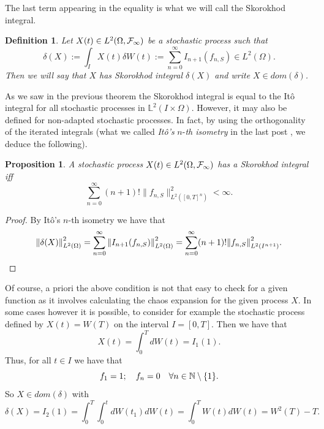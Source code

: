 \documentclass[12pt]{article}
\newtheorem{proposition}{Proposition}
\newtheorem{definition}{Definition}
\begin{document}
The last term appearing in the equality is what we will call the Skorokhod integral.
\begin{definition}
	Let $X(t)\in L^2(\Omega,\mathcal{F}_\infty)$ be a  stochastic process such that
	\begin{equation*}
		\delta(X):=\int_{I} X(t)\delta W(t):=\sum_{n=0}^{\infty} I_{n+1}(f_{n,S})\in L^2(\Omega).
	\end{equation*}
	Then we will say that $X$ has Skorokhod integral $\delta(X)$ and write $X\in dom(\delta)$.
\end{definition}
As we saw in the previous theorem the Skorokhod integral is equal to the Itô integral for all stochastic processes in $\mathbb{L}^2(I\times\Omega)$. However, it may also be defined for non-adapted stochastic processes. In fact, by using the orthogonality of the iterated integrals (what we called \emph{Itô's} $n$-\emph{th isometry} in the last post \cite{Chaosblog}, we deduce the following).
\begin{proposition}
	A stochastic process $X(t)\in L^2(\Omega,\mathcal{F}_\infty)$ has a Skorokhod integral iff
	\begin{equation*}
		\sum_{n=0}^{\infty} (n+1)!\|f_{n,S}\|^2_{L^2([0,T]^n)}<\infty.
	\end{equation*}

\end{proposition}
\begin{proof}
	By Itô's $n$-th isometry we have that
	\begin{equation*}
		\norm{\delta(X)}^2_{L^2(\Omega)}=\sum_{n=0}^{\infty}  \norm{I_{n+1}(f_{n,S})}_{L^2(\Omega)}^2=\sum_{n=0}^{\infty} (n+1)!\norm{f_{n,S}}_{L^2(I^{n+1})}^2.
	\end{equation*}
\end{proof}
Of course, a priori the above condition is not that easy to check for a given function as it involves calculating the chaos expansion for the given process $X$. In some cases however it is possible, to consider for example the stochastic process defined by $X(t)=W(T)$ on the interval $I=[0,T]$. Then we have that
\begin{equation*}
	X(t)=\int_{0}^T dW(t)=I_1(1).
\end{equation*}
Thus, for all $t\in I$ we have that
\begin{equation*}
	f_1=1;\quad f_n=0\quad\forall n \in \mathbb{N} \setminus \{1\}  .
\end{equation*}
So $X\in dom(\delta)$ with
\begin{equation*}
	\delta(X)= I_2(1)=\int_{0}^T\int_{0}^t dW(t_1)dW(t)=\int_{0}^T W(t) dW(t)= W^2(T)-T.
\end{equation*}
\end{document}
